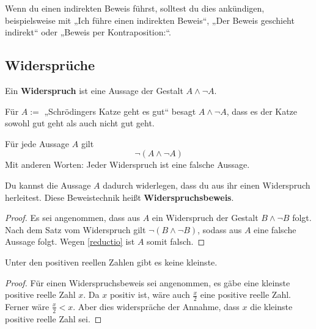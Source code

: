   
\begin{bem}
    Wenn du einen indirekten Beweis führst, solltest du dies ankündigen, beispielsweise mit „Ich führe einen indirekten Beweis“, „Der Beweis geschieht indirekt“ oder „Beweis per Kontraposition:“.
\end{bem}





\subsection*{Widersprüche}


\begin{defin} 
    Ein \textbf{Widerspruch} ist eine Aussage der Gestalt $A\land \neg A$.
\end{defin}


\begin{bsp}
    Für $A:=$ „Schrödingers Katze geht es gut“ besagt $A\land \neg A$, dass es der Katze sowohl gut geht als auch nicht gut geht.
\end{bsp}


\begin{axiom} 
    Für jede Aussage $A$ gilt
        \[ \neg(A\land \neg A) \]
    Mit anderen Worten: Jeder Widerspruch ist eine falsche Aussage.
\end{axiom}


\begin{satz} \label{widerspruchsbeweis} 
    Du kannst die Aussage $A$ dadurch widerlegen, dass du aus ihr einen Widerspruch herleitest. Diese Beweistechnik heißt \textbf{Widerspruchsbeweis}.
\end{satz}
\begin{proof}
    Es sei angenommen, dass aus $A$ ein Widerspruch der Gestalt $B\land \neg B$ folgt. Nach dem Satz vom Widerspruch gilt $\neg (B\land \neg B)$, sodass aus $A$ eine falsche Aussage folgt. Wegen \cref{reductio} ist $A$ somit falsch.
\end{proof}

  
\begin{bsp} \label{bsp:widerspruchsbeweis}
    Unter den positiven reellen Zahlen gibt es keine kleinste.
\end{bsp}
\begin{proof}
    Für einen Widerspruchsbeweis sei angenommen, es gäbe eine kleinste positive reelle Zahl $x$. Da $x$ positiv ist, wäre auch $\frac{x}{2}$ eine positive reelle Zahl. Ferner wäre $\frac{x}{2}<x$. Aber dies widerspräche der Annahme, dass $x$ die kleinste positive reelle Zahl sei.
\end{proof}
  
